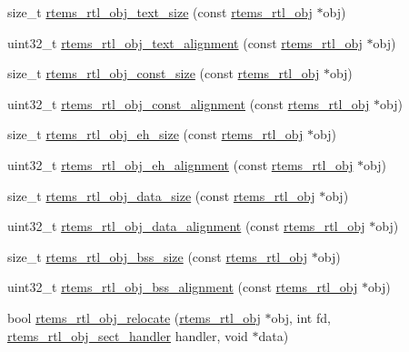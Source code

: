 \begin{DoxyCompactItemize}
\item 
size\+\_\+t \mbox{\hyperlink{rtl-obj_8h_a4df3f868b6e5b13ec7e326028683e87a}{rtems\+\_\+rtl\+\_\+obj\+\_\+text\+\_\+size}} (const \mbox{\hyperlink{structrtems__rtl__obj}{rtems\+\_\+rtl\+\_\+obj}} $\ast$obj)
\item 
uint32\+\_\+t \mbox{\hyperlink{rtl-obj_8h_a21f97e47f7caa7bb88f685f2b5b7d18b}{rtems\+\_\+rtl\+\_\+obj\+\_\+text\+\_\+alignment}} (const \mbox{\hyperlink{structrtems__rtl__obj}{rtems\+\_\+rtl\+\_\+obj}} $\ast$obj)
\item 
size\+\_\+t \mbox{\hyperlink{rtl-obj_8h_a2ce7672560ab13914b32a683650c03cf}{rtems\+\_\+rtl\+\_\+obj\+\_\+const\+\_\+size}} (const \mbox{\hyperlink{structrtems__rtl__obj}{rtems\+\_\+rtl\+\_\+obj}} $\ast$obj)
\item 
uint32\+\_\+t \mbox{\hyperlink{rtl-obj_8h_aee3ea1f29f12981579b1d1939bb9907f}{rtems\+\_\+rtl\+\_\+obj\+\_\+const\+\_\+alignment}} (const \mbox{\hyperlink{structrtems__rtl__obj}{rtems\+\_\+rtl\+\_\+obj}} $\ast$obj)
\item 
size\+\_\+t \mbox{\hyperlink{rtl-obj_8h_a4dbc1988e76114f9d94e56f01b034901}{rtems\+\_\+rtl\+\_\+obj\+\_\+eh\+\_\+size}} (const \mbox{\hyperlink{structrtems__rtl__obj}{rtems\+\_\+rtl\+\_\+obj}} $\ast$obj)
\item 
uint32\+\_\+t \mbox{\hyperlink{rtl-obj_8h_aa093ee073ed78505eab0edc5eefee8b7}{rtems\+\_\+rtl\+\_\+obj\+\_\+eh\+\_\+alignment}} (const \mbox{\hyperlink{structrtems__rtl__obj}{rtems\+\_\+rtl\+\_\+obj}} $\ast$obj)
\item 
size\+\_\+t \mbox{\hyperlink{rtl-obj_8h_a603ec80c7cf7d1a2f01f400b3e5c93d8}{rtems\+\_\+rtl\+\_\+obj\+\_\+data\+\_\+size}} (const \mbox{\hyperlink{structrtems__rtl__obj}{rtems\+\_\+rtl\+\_\+obj}} $\ast$obj)
\item 
uint32\+\_\+t \mbox{\hyperlink{rtl-obj_8h_a9a3dae296e05206c99846c099789becc}{rtems\+\_\+rtl\+\_\+obj\+\_\+data\+\_\+alignment}} (const \mbox{\hyperlink{structrtems__rtl__obj}{rtems\+\_\+rtl\+\_\+obj}} $\ast$obj)
\item 
size\+\_\+t \mbox{\hyperlink{rtl-obj_8h_a6125a7787e7b842bc39aa69370b7db2b}{rtems\+\_\+rtl\+\_\+obj\+\_\+bss\+\_\+size}} (const \mbox{\hyperlink{structrtems__rtl__obj}{rtems\+\_\+rtl\+\_\+obj}} $\ast$obj)
\item 
uint32\+\_\+t \mbox{\hyperlink{rtl-obj_8h_a02b040b6c3f07084733c2cb226e98fb8}{rtems\+\_\+rtl\+\_\+obj\+\_\+bss\+\_\+alignment}} (const \mbox{\hyperlink{structrtems__rtl__obj}{rtems\+\_\+rtl\+\_\+obj}} $\ast$obj)
\item 
bool \mbox{\hyperlink{rtl-obj_8h_a39ef15efbb0f5eddd01c677d77d9c33e}{rtems\+\_\+rtl\+\_\+obj\+\_\+relocate}} (\mbox{\hyperlink{structrtems__rtl__obj}{rtems\+\_\+rtl\+\_\+obj}} $\ast$obj, int fd, \mbox{\hyperlink{rtl-obj_8h_a7af5827cf336da33eef4564a6e00ba11}{rtems\+\_\+rtl\+\_\+obj\+\_\+sect\+\_\+handler}} handler, void $\ast$data)

\end{DoxyCompactItemize}
